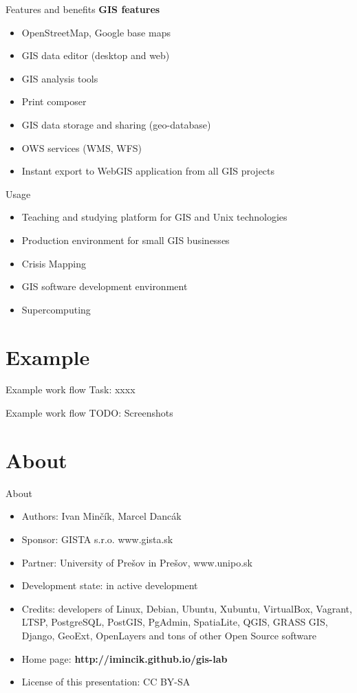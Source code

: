 \documentclass[12pt]{beamer}
\begin{document}
\begin{frame}{Features and benefits}
	\textbf{GIS features}
	\begin{itemize}
		\item OpenStreetMap, Google base maps
		\item GIS data editor (desktop and web)
		\item GIS analysis tools
		\item Print composer
		\item GIS data storage and sharing (geo-database)
		\item OWS services (WMS, WFS)
		\item Instant export to WebGIS application from all GIS projects
	\end{itemize}
\end{frame}


\begin{frame}{Usage}
	\begin{itemize}
		\item Teaching and studying platform for GIS and Unix technologies
		\item Production environment for small GIS businesses
		\item Crisis Mapping
		\item GIS software development environment
		\item Supercomputing
	\end{itemize}
\end{frame}


\section{Example}
\begin{frame}{Example work flow}
	Task: xxxx
\end{frame}


\begin{frame}{Example work flow}
	TODO: Screenshots
\end{frame}


\section{About}
\begin{frame}{About}
	\begin{itemize}
		\item Authors: Ivan Minčík, Marcel Dancák
		\item Sponsor: GISTA s.r.o. www.gista.sk
		\item Partner: University of Prešov in Prešov, www.unipo.sk
		\item Development state: in active development
		\item Credits: developers of Linux, Debian, Ubuntu, Xubuntu, VirtualBox, Vagrant, LTSP, PostgreSQL, PostGIS, PgAdmin, SpatiaLite, QGIS, GRASS GIS, Django, GeoExt, OpenLayers and tons of other Open Source software
		\item Home page: \textbf{http://imincik.github.io/gis-lab}
		\item License of this presentation: CC BY-SA
	\end{itemize}
\end{frame}
\end{document}
